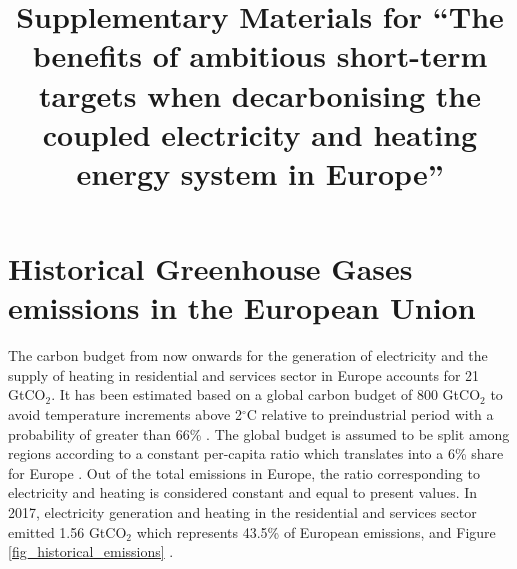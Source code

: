 \documentclass[3p]{elsarticle} %
\begin{document}
\begin{frontmatter}

\title{Supplementary Materials for ``The benefits of ambitious short-term targets when decarbonising the coupled electricity and heating energy system in Europe'' }









\end{frontmatter}

\section{Historical Greenhouse Gases emissions in the European Union}

The carbon budget from now onwards for the generation of electricity and the supply of heating in residential and services sector in Europe accounts for 21 GtCO$_2$. It has been estimated based on a global carbon budget of 800 GtCO$_2$ to avoid temperature increments above 2$^{\circ}$C relative to preindustrial period with a probability of greater than 66\% \cite{Figueres_2017, blog_budget}. The global budget is assumed to be split among regions according to a constant per-capita ratio which translates into a 6\% share for Europe \cite{Raupach_2014}. Out of the total emissions in Europe, the ratio corresponding to electricity and heating is considered constant and equal to present values. In 2017, electricity generation and heating in the residential and services sector emitted 1.56 GtCO$_2$ which represents 43.5\% of European emissions,  \cite{UNFCCC_inventory} and Figure \ref{fig_historical_emissions} . \\
\end{document}
